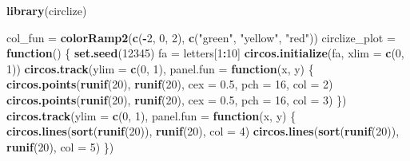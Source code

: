 \documentclass[]{book}
\newenvironment{Shaded}{\begin{snugshade}}{\end{snugshade}}
\newcommand{\KeywordTok}[1]{\textcolor[rgb]{0.13,0.29,0.53}{\textbf{#1}}}
\newcommand{\DataTypeTok}[1]{\textcolor[rgb]{0.13,0.29,0.53}{#1}}
\newcommand{\DecValTok}[1]{\textcolor[rgb]{0.00,0.00,0.81}{#1}}
\newcommand{\FloatTok}[1]{\textcolor[rgb]{0.00,0.00,0.81}{#1}}
\newcommand{\StringTok}[1]{\textcolor[rgb]{0.31,0.60,0.02}{#1}}
\newcommand{\ControlFlowTok}[1]{\textcolor[rgb]{0.13,0.29,0.53}{\textbf{#1}}}
\newcommand{\OperatorTok}[1]{\textcolor[rgb]{0.81,0.36,0.00}{\textbf{#1}}}
\newcommand{\NormalTok}[1]{#1}
\theoremstyle{definition}
\theoremstyle{definition}
\theoremstyle{remark}
\begin{document}
\begin{Shaded}
\begin{Highlighting}[]
\KeywordTok{library}\NormalTok{(circlize)}

\NormalTok{col_fun =}\StringTok{ }\KeywordTok{colorRamp2}\NormalTok{(}\KeywordTok{c}\NormalTok{(}\OperatorTok{-}\DecValTok{2}\NormalTok{, }\DecValTok{0}\NormalTok{, }\DecValTok{2}\NormalTok{), }\KeywordTok{c}\NormalTok{(}\StringTok{"green"}\NormalTok{, }\StringTok{"yellow"}\NormalTok{, }\StringTok{"red"}\NormalTok{))}
\NormalTok{circlize_plot =}\StringTok{ }\ControlFlowTok{function}\NormalTok{() \{}
    \KeywordTok{set.seed}\NormalTok{(}\DecValTok{12345}\NormalTok{)}
\NormalTok{    fa =}\StringTok{ }\NormalTok{letters[}\DecValTok{1}\OperatorTok{:}\DecValTok{10}\NormalTok{]}
    \KeywordTok{circos.initialize}\NormalTok{(fa, }\DataTypeTok{xlim =} \KeywordTok{c}\NormalTok{(}\DecValTok{0}\NormalTok{, }\DecValTok{1}\NormalTok{))}
    \KeywordTok{circos.track}\NormalTok{(}\DataTypeTok{ylim =} \KeywordTok{c}\NormalTok{(}\DecValTok{0}\NormalTok{, }\DecValTok{1}\NormalTok{), }\DataTypeTok{panel.fun =} \ControlFlowTok{function}\NormalTok{(x, y) \{}
        \KeywordTok{circos.points}\NormalTok{(}\KeywordTok{runif}\NormalTok{(}\DecValTok{20}\NormalTok{), }\KeywordTok{runif}\NormalTok{(}\DecValTok{20}\NormalTok{), }\DataTypeTok{cex =} \FloatTok{0.5}\NormalTok{, }\DataTypeTok{pch =} \DecValTok{16}\NormalTok{, }\DataTypeTok{col =} \DecValTok{2}\NormalTok{)}
        \KeywordTok{circos.points}\NormalTok{(}\KeywordTok{runif}\NormalTok{(}\DecValTok{20}\NormalTok{), }\KeywordTok{runif}\NormalTok{(}\DecValTok{20}\NormalTok{), }\DataTypeTok{cex =} \FloatTok{0.5}\NormalTok{, }\DataTypeTok{pch =} \DecValTok{16}\NormalTok{, }\DataTypeTok{col =} \DecValTok{3}\NormalTok{)}
\NormalTok{    \})}
    \KeywordTok{circos.track}\NormalTok{(}\DataTypeTok{ylim =} \KeywordTok{c}\NormalTok{(}\DecValTok{0}\NormalTok{, }\DecValTok{1}\NormalTok{), }\DataTypeTok{panel.fun =} \ControlFlowTok{function}\NormalTok{(x, y) \{}
        \KeywordTok{circos.lines}\NormalTok{(}\KeywordTok{sort}\NormalTok{(}\KeywordTok{runif}\NormalTok{(}\DecValTok{20}\NormalTok{)), }\KeywordTok{runif}\NormalTok{(}\DecValTok{20}\NormalTok{), }\DataTypeTok{col =} \DecValTok{4}\NormalTok{)}
        \KeywordTok{circos.lines}\NormalTok{(}\KeywordTok{sort}\NormalTok{(}\KeywordTok{runif}\NormalTok{(}\DecValTok{20}\NormalTok{)), }\KeywordTok{runif}\NormalTok{(}\DecValTok{20}\NormalTok{), }\DataTypeTok{col =} \DecValTok{5}\NormalTok{)}
\NormalTok{    \})}


\end{Highlighting}
\end{Shaded}
\end{document}

